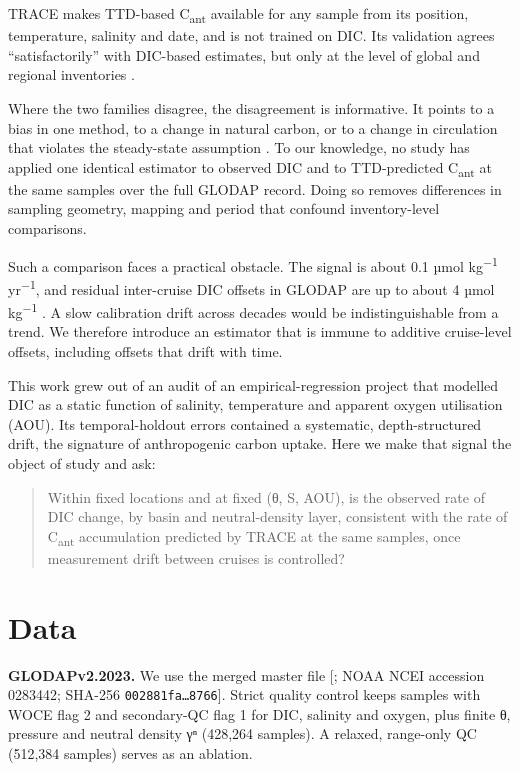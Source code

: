 \documentclass[11pt]{article}
\begin{document}
TRACE \citep{Carter2025, Sandborn2026} makes TTD-based
C\textsubscript{ant} available for any sample from its position,
temperature, salinity and date, and is not trained on DIC. Its
validation agrees ``satisfactorily'' with DIC-based estimates, but only
at the level of global and regional inventories \citep{Sandborn2026}.

Where the two families disagree, the disagreement is informative. It
points to a bias in one method, to a change in natural carbon, or to a
change in circulation that violates the steady-state assumption
\citep{Gruber2019, Mueller2023}. To our knowledge, no study has applied
one identical estimator to observed DIC and to TTD-predicted
C\textsubscript{ant} at the same samples over the full GLODAP record.
Doing so removes differences in sampling geometry, mapping and period
that confound inventory-level comparisons.

Such a comparison faces a practical obstacle. The signal is about 0.1
µmol kg\textsuperscript{−1} yr\textsuperscript{−1}, and residual
inter-cruise DIC offsets in GLODAP are up to about 4 µmol
kg\textsuperscript{−1} \citep{Olsen2016, Lauvset2024}. A slow
calibration drift across decades would be indistinguishable from a
trend. We therefore introduce an estimator that is immune to additive
cruise-level offsets, including offsets that drift with time.

This work grew out of an audit of an empirical-regression project that
modelled DIC as a static function of salinity, temperature and apparent
oxygen utilisation (AOU). Its temporal-holdout errors contained a
systematic, depth-structured drift, the signature of anthropogenic
carbon uptake. Here we make that signal the object of study and ask:

\begin{quote}
Within fixed locations and at fixed (θ, S, AOU), is the observed rate of
DIC change, by basin and neutral-density layer, consistent with the rate
of C\textsubscript{ant} accumulation predicted by TRACE at the same
samples, once measurement drift between cruises is controlled?
\end{quote}

\section{Data}\label{data}

\textbf{GLODAPv2.2023.} We use the merged master file
{[}\citet{Lauvset2024}; NOAA NCEI accession 0283442; SHA-256
\texttt{002881fa…8766}{]}. Strict quality control keeps samples with
WOCE flag 2 and secondary-QC flag 1 for DIC, salinity and oxygen, plus
finite θ, pressure and neutral density γⁿ (428,264 samples). A relaxed,
range-only QC (512,384 samples) serves as an ablation.
\end{document}
